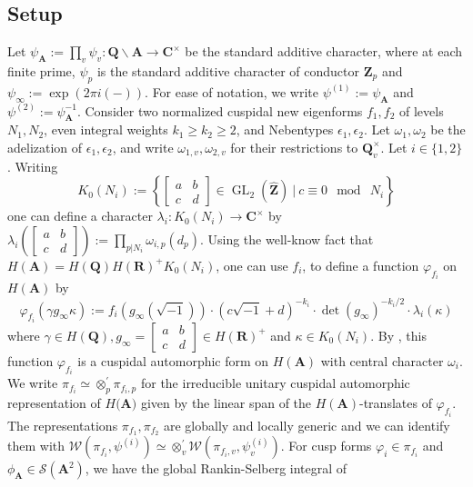 \documentclass{amsart}
\theoremstyle{plain}
\theoremstyle{plain}
\theoremstyle{remark}
\DeclareMathOperator{\GL}{GL}
\begin{document}
\subsection{Setup}\label{sec setup}
Let $\psi_\mathbf{A}:=\prod_v\psi_v:\mathbf{Q}\backslash \mathbf{A}\rightarrow\mathbf{C}^\times$ be the standard additive character, where at each finite prime, $\psi_p$ is the standard additive character of conductor $\mathbf{Z}_p$ and $\psi_\infty:=\exp(2\pi i(-))$. For ease of notation, we write  $\psi^{(1)}:=\psi_\mathbf{A}$ and $\psi^{(2)}:=\psi_\mathbf{A}^{-1}$. Consider two normalized cuspidal new eigenforms $f_1,f_2$ of levels $N_1,N_2$, even integral weights $k_1\geq k_2\geq 2$, and Nebentypes $\epsilon_1,\epsilon_2$. Let $\omega_1,\omega_2$ be the adelization of $\epsilon_1,\epsilon_2$, and write $\omega_{1,v},\omega_{2,v}$ for their restrictions to $\mathbf{Q}_v^\times$. Let $i\in\{1,2\}$. Writing 
$$K_0(N_i):=\left\{\left[\begin{smallmatrix}
    a & b\\
    c & d
\end{smallmatrix}\right]\in \GL_2(\hat{\mathbf{Z}})\ |\ c\equiv0\mod\ N_i \right\}$$
one can define a character $\lambda_i:K_0(N_i)\rightarrow\mathbf{C}^\times$ by $\lambda_i(\left[\begin{smallmatrix}
    a & b\\
    c & d
\end{smallmatrix}\right]):=\prod_{p|N_i}\omega_{i,p}(d_p)$. Using the well-know fact that $H(\mathbf{A})=H(\mathbf{Q})H(\mathbf{R})^+K_0(N_i)$, one can use $f_i$, to define a function $\varphi_{f_i}$ on $H(\mathbf{A})$ by 
$$\varphi_{f_i}(\gamma g_\infty \kappa):=f_i(g_\infty (\sqrt{ -1}))\cdot (c\sqrt{-1}+d)^{-k_i}\cdot \det(g_\infty)^{-k_i/2}\cdot \lambda_i(\kappa)$$
where $\gamma\in H(\mathbf{Q}), g_\infty=\left[\begin{smallmatrix}
    a & b\\
    c & d
\end{smallmatrix}\right]\in H(\mathbf{R})^+$ and $\kappa\in K_0(N_i)$. By \cite{gelbart1975automorphic}, this function $\varphi_{f_i}$ is a cuspidal automorphic form on $H(\mathbf{A})$ with central character $\omega_i$. We write $\pi_{f_i}\simeq\otimes_p^{'}\pi_{f_i,p}$ for the irreducible unitary cuspidal automorphic representation of $H(\mathbf{A)}$ given by the linear span of the $H(\mathbf{A})$-translates of $\varphi_{f_i}$. The representations $\pi_{f_1},\pi_{f_2}$ are globally and locally generic and we can identify them with $\mathcal{W}(\pi_{f_i},\psi^{(i)})\simeq \otimes^{'}_v \mathcal{W}(\pi_{f_i,v},\psi_v^{(i)})$. For cusp forms $\varphi_i\in\pi_{f_i}$ and $\phi_\mathbf{A}\in\mathcal{S}(\mathbf{A}^2)$, we have the global Rankin-Selberg integral of \cite{jacquet1981euler}
\end{document}

